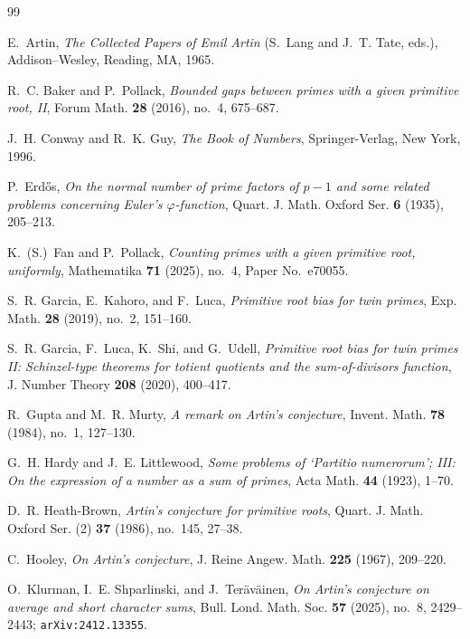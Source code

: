 \documentclass[11pt]{amsart}
\theoremstyle{definition}
\begin{document}
\begin{thebibliography}{99}

	E.~Artin,
	\emph{The Collected Papers of Emil Artin} (S.~Lang and J.~T. Tate, eds.),
	Addison--Wesley, Reading, MA, 1965.

	R.~C. Baker and P.~Pollack,
	\emph{Bounded gaps between primes with a given primitive root, II},
	Forum Math. \textbf{28} (2016), no.~4, 675--687.

	J.~H. Conway and R.~K. Guy,
	\emph{The Book of Numbers},
	Springer-Verlag, New York, 1996.

	P.~Erd\H{o}s,
	\emph{On the normal number of prime factors of $p-1$ and some related problems
		concerning Euler's $\varphi$-function},
	Quart. J. Math. Oxford Ser. \textbf{6} (1935), 205--213.

	K.~(S.)~Fan and P.~Pollack,
	\emph{Counting primes with a given primitive root, uniformly},
	Mathematika \textbf{71} (2025), no.~4, Paper No.~e70055.

	S.~R. Garcia, E.~Kahoro, and F.~Luca,
	\emph{Primitive root bias for twin primes},
	Exp. Math. \textbf{28} (2019), no.~2, 151--160.

	S.~R. Garcia, F.~Luca, K.~Shi, and G.~Udell,
	\emph{Primitive root bias for twin primes II: Schinzel-type theorems for
		totient quotients and the sum-of-divisors function},
	J. Number Theory \textbf{208} (2020), 400--417.

	R.~Gupta and M.~R. Murty,
	\emph{A remark on Artin's conjecture},
	Invent. Math. \textbf{78} (1984), no.~1, 127--130.

	G.~H. Hardy and J.~E. Littlewood,
	\emph{Some problems of `Partitio numerorum'; III: On the expression of a
		number as a sum of primes},
	Acta Math. \textbf{44} (1923), 1--70.

	D.~R. Heath-Brown,
	\emph{Artin's conjecture for primitive roots},
	Quart. J. Math. Oxford Ser. (2) \textbf{37} (1986), no.~145, 27--38.

	C.~Hooley,
	\emph{On Artin's conjecture},
	J. Reine Angew. Math. \textbf{225} (1967), 209--220.

	O.~Klurman, I.~E. Shparlinski, and J.~Ter\"av\"ainen,
	\emph{On Artin's conjecture on average and short character sums},
	Bull. Lond. Math. Soc. \textbf{57} (2025), no.~8, 2429--2443;
	\texttt{arXiv:2412.13355}.


\end{thebibliography}
\end{document}
